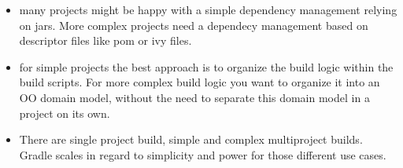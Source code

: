 \begin{description}
	\begin{itemize}
		\item many projects might be happy with a simple dependency management relying on jars. More complex projects need a dependecy management based on descriptor files like pom or ivy files.
	    \item for simple projects the best approach is to organize the build logic within the build scripts. For more complex build logic you want to organize it into an OO domain model, without the need to separate this domain model in a project on its own.
	    \item There are single project build, simple and complex multiproject builds. Gradle scales in regard to simplicity and power for those different use cases.
	\end{itemize}
\end{description}
